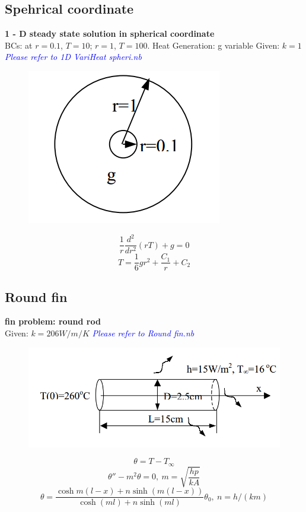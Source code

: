 \begin{appendices}
\subsection{Spehrical coordinate}
\begin{example}
\textbf{1 - D steady state solution in spherical coordinate}\\
BCs: at $r = 0.1$, $T = 10$; $r = 1$, $T = 100$.
Heat Generation: g variable
Given: $k=1$ \textcolor{blue} {\emph{Please refer to 1D VariHeat spheri.nb}}
\begin{figure}[H]
  \centering
    \includegraphics[scale=0.5]{figures/appendixA/2}
\end{figure}
$$\frac{1}{r}\frac{d^2}{dr^2}(rT)+g=0$$
$$T=\frac{1}{6}gr^2+\frac{C_1}{r}+C_2$$
\end{example}

\subsection{Round fin}
\begin{example}
\textbf{fin problem: round rod}\\
Given: $k=206W/m/K$
\textcolor{blue} {\emph{Please refer to Round fin.nb}}
\begin{figure}[H]
  \centering
    \includegraphics[scale=0.5]{figures/appendixA/3}
\end{figure}
$$\theta=T-T_\infty$$
$$\theta''-m^2\theta=0,~m=\sqrt{\frac{hp}{kA}}$$
$$\theta=\frac{\cosh{m(l-x)}+n\sinh{(m(l-x))}}{\cosh{(ml)}+n\sinh{(ml)}}\theta_0,~n=h/(km)$$
\end{example}


\end{appendices}
